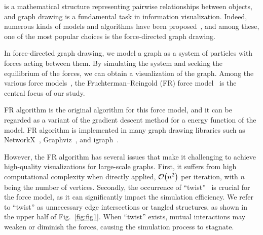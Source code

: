 \documentclass[dvipdfmx,10pt,journal,compsoc]{IEEEtran}
\begin{document}
 is a mathematical structure representing pairwise relationships between objects, and graph drawing is a fundamental task in information visualization.
Indeed, numerous kinds of models and algorithms have been proposed~\cite{tutteHowDrawGraph1963,chrobakLineartimeAlgorithmDrawing1995,sugiyamaMethodsVisualUnderstanding1981}, and among these, one of the most popular choices is the force-directed graph drawing.

In force-directed graph drawing, we model a graph as a system of particles with forces acting between them. By simulating the system and seeking the equilibrium of the forces, we can obtain a visualization of the graph.
Among the various force models~\cite{eades1984heuristic,kamadaAlgorithmDrawingGeneral1989}, the Fruchterman--Reingold (FR) force model~\cite{fruchtermanGraphDrawingForcedirected1991,kobourovSpringEmbeddersForce2012} is the central focus of our study.

FR algorithm is the original algorithm for this force model, and it can be regarded as a variant of the gradient descent method for a energy function of the model.
FR algorithm is implemented in many graph drawing libraries such as NetworkX~\cite{hagberg2008exploring}, Graphviz~\cite{ellsonGraphvizOpenSource2002}, and igraph~\cite{csardiIgraphSoftwarePackage2006}.

However, the FR algorithm has several issues that make it challenging to achieve high-quality visualizations for large-scale graphs.
First, it suffers from high computational complexity when directly applied, $\order{n^2}$ per iteration, with $n$ being the number of vertices.
Secondly, the occurrence of ``twist''~\cite{cheongSnapshotVisualizationComplex2018} is crucial for the force model, as it can significantly impact the simulation efficiency.
We refer to ``twist'' as unnecessary edge intersections or tangled structures, as shown in the upper half of Fig.~\ref{fig:fig1}.
When ``twist'' exists, mutual interactions may weaken or diminish the forces, causing the simulation process to stagnate.
\end{document}
